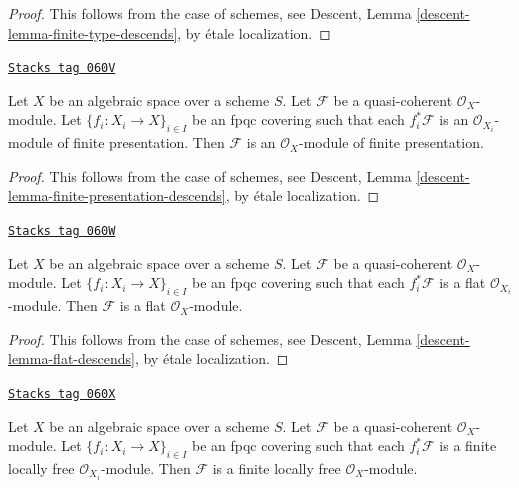\begin{proof}
This follows from the case of schemes, see
Descent, Lemma \ref{descent-lemma-finite-type-descends},
by \'etale localization.
\end{proof}

\begin{lemma}
\label{spaces-descent-lemma-finite-presentation-descends}
\href{https://stacks.math.columbia.edu/tag/060V}{\texttt{Stacks tag 060V}}

Let $X$ be an algebraic space over a scheme $S$.
Let $\mathcal{F}$ be a quasi-coherent $\mathcal{O}_X$-module.
Let $\{f_i : X_i \to X\}_{i \in I}$ be an fpqc covering such that
each $f_i^*\mathcal{F}$ is an $\mathcal{O}_{X_i}$-module of finite
presentation. Then $\mathcal{F}$ is an $\mathcal{O}_X$-module
of finite presentation.
\end{lemma}

\begin{proof}
This follows from the case of schemes, see
Descent, Lemma \ref{descent-lemma-finite-presentation-descends},
by \'etale localization.
\end{proof}

\begin{lemma}
\label{spaces-descent-lemma-flat-descends}
\href{https://stacks.math.columbia.edu/tag/060W}{\texttt{Stacks tag 060W}}

Let $X$ be an algebraic space over a scheme $S$.
Let $\mathcal{F}$ be a quasi-coherent $\mathcal{O}_X$-module.
Let $\{f_i : X_i \to X\}_{i \in I}$ be an fpqc covering such that
each $f_i^*\mathcal{F}$ is a flat $\mathcal{O}_{X_i}$-module.
Then $\mathcal{F}$ is a flat $\mathcal{O}_X$-module.
\end{lemma}

\begin{proof}
This follows from the case of schemes, see
Descent, Lemma \ref{descent-lemma-flat-descends},
by \'etale localization.
\end{proof}

\begin{lemma}
\label{spaces-descent-lemma-finite-locally-free-descends}
\href{https://stacks.math.columbia.edu/tag/060X}{\texttt{Stacks tag 060X}}

Let $X$ be an algebraic space over a scheme $S$.
Let $\mathcal{F}$ be a quasi-coherent $\mathcal{O}_X$-module.
Let $\{f_i : X_i \to X\}_{i \in I}$ be an fpqc covering such that
each $f_i^*\mathcal{F}$ is a finite locally free $\mathcal{O}_{X_i}$-module.
Then $\mathcal{F}$ is a finite locally free $\mathcal{O}_X$-module.
\end{lemma}

